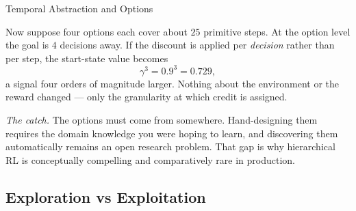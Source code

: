 \begin{v3topic}{Temporal Abstraction and Options}
\begin{workedexample}
Now suppose four options each cover about $25$ primitive steps. At the option
level the goal is $4$ decisions away. If the discount is applied per
\emph{decision} rather than per step, the start-state value becomes
\[
  \gamma^{3} = 0.9^{3} = 0.729 ,
\]
a signal four orders of magnitude larger. Nothing about the environment or the
reward changed --- only the granularity at which credit is assigned.

\emph{The catch.} The options must come from somewhere. Hand-designing them
requires the domain knowledge you were hoping to learn, and discovering them
automatically remains an open research problem. That gap is why hierarchical
RL is conceptually compelling and comparatively rare in production.
\end{workedexample}

\end{v3topic}

    \subsection{Exploration vs Exploitation}

